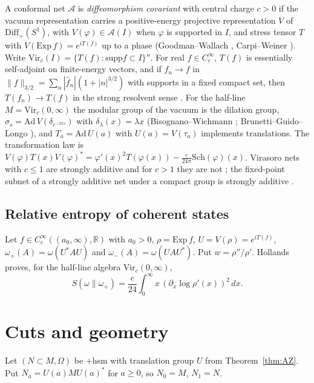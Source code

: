\documentclass[12pt]{article}
\theoremstyle{definition}
\theoremstyle{remark}
\begin{document}
A conformal net \(\mathcal A\) is \emph{diffeomorphism covariant} with central
charge \(c>0\) if the vacuum representation carries a positive-energy projective
representation \(V\) of \(\mathrm{Diff}_+(S^1)\), with \(V(\varphi)\in\mathcal A(I)\)
when \(\varphi\) is supported in \(I\), and stress tensor \(T\) with
\(V(\mathrm{Exp}\,f)=e^{iT(f)}\) up to a phase (Goodman--Wallach \cite{GW}, Carpi--Weiner \cite{CW}).
Write \(\mathrm{Vir}_c(I)=\{T(f):\mathrm{supp}f\subset I\}''\). For real \(f\in
C_c^\infty\), \(T(f)\) is essentially self-adjoint on finite-energy vectors, and if
\(f_n\to f\) in \(\|f\|_{3/2}=\sum_n|\hat f_n|(1+|n|^{3/2})\) with supports in a fixed
compact set, then \(T(f_n)\to T(f)\) in the strong resolvent sense
\cite[Thm.~4.4, Prop.~4.5]{CW}. For the half-line \(M=\mathrm{Vir}_c(0,\infty)\) the
modular group of the vacuum is the dilation group, \(\sigma_s=\mathrm{Ad}\,V(\delta_{e^{-2\pi s}})\)
with \(\delta_\lambda(x)=\lambda x\) (Bisognano--Wichmann \cite{BW}; Brunetti--Guido--Longo \cite{BGL}), and \(T_a=\mathrm{Ad}\,U(a)\) with \(U(a)=V(\tau_a)\) implements
translations. The transformation law is
\(V(\varphi)T(x)V(\varphi)^*=\varphi'(x)^2T(\varphi(x))-\tfrac c{24\pi}\mathrm{Sch}(\varphi)(x)\).
Virasoro nets with \(c\le1\) are strongly additive and for \(c>1\) they are not
\cite[\S2.4]{Carpi}; the fixed-point subnet of a strongly additive net under a
compact group is strongly additive \cite{Xu}.

\subsection{Relative entropy of coherent states}\label{sec:hollands}

Let \(f\in C_c^\infty((a_0,\infty),\mathbb R)\) with \(a_0>0\), \(\rho=\mathrm{Exp}\,f\),
\(U=V(\rho)=e^{iT(f)}\), \(\omega_+(A)=\omega(U^*AU)\) and
\(\omega_-(A)=\omega(UAU^*)\). Put \(w=\rho''/\rho'\). Hollands
\cite[Thm.~1]{Hollands} proves, for the half-line algebra \(\mathrm{Vir}_c(0,\infty)\),
\begin{equation}\label{eq:hollands}
S(\omega\|\omega_+)=\frac{c}{24}\int_0^\infty x\,(\partial_x\log\rho'(x))^2\,dx .
\end{equation}

\section{Cuts and geometry}\label{sec:cut}

Let \((N\subset M,\Omega)\) be \(+\)hsm with translation group \(U\) from
Theorem~\ref{thm:AZ}. Put \(N_a=U(a)MU(a)^*\) for \(a\ge0\), so \(N_0=M\), \(N_1=N\).
\end{document}
